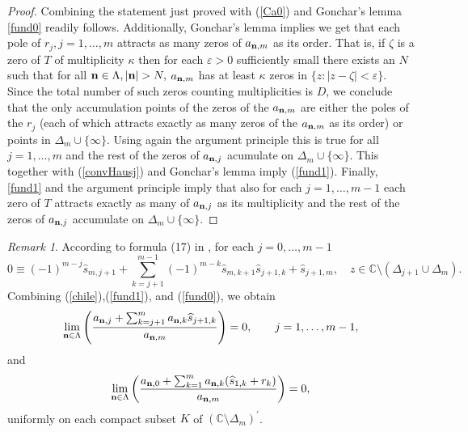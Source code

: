 \documentclass[10pt,a4paper]{article}
\theoremstyle{definition}
\theoremstyle{remark}
\newtheorem{remark}[theorem]{Remark}
\numberwithin{equation}{section}
\begin{document}
\begin{proof}
Combining the statement just proved with (\ref{Ca0}) and Gonchar's lemma \eqref{fund0} readily follows. Additionally, Gonchar's lemma implies  we get that each pole
of $r_j, j=1,\ldots,m$ attracts as many zeros of $a_{{\bf n},m}$ as its order. That is, if $\zeta$ is a zero of $T$ of multiplicity $\kappa$ then for each $\varepsilon >0$ sufficiently small there exists an $N$ such that for all ${\bf n} \in \Lambda, |{\bf n}| > N,$  $a_{{\bf n},m}$ has at least $\kappa$ zeros in $\{z:|z-\zeta| < \varepsilon\}$. Since the total number of such zeros counting multiplicities is $D$, we conclude that the only accumulation points of the zeros of the $a_{{\bf n},m}$ are either the poles of the $r_j$ (each of which attracts exactly as many zeros of the $a_{{\bf n},m}$ as its order) or points in $\Delta_m \cup \{\infty\}$. Using again the argument principle this is true for all $j=1,\ldots,m$ and the rest of the zeros of $a_{{\bf n},j}$ acumulate on $\Delta_m \cup \{\infty\}$. This together with  (\ref{convHausj}) and Gonchar's lemma imply  (\ref{fund1}). Finally,  \eqref{fund1} and the argument principle imply that also for each $j=1,\ldots,m-1$ each zero of $T$ attracts exactly as many of $a_{{\bf n},j}$ as its multiplicity and the rest of the zeros of $a_{{\bf n},j}$ accumulate on $\Delta_m \cup \{\infty\}$.
\end{proof}

\begin{remark}
According to formula (17) in \cite[Lemma 2.9]{FL4II}, for each $j=0,\ldots, m-1$
\begin{equation}\label{chile}
 0 \equiv (-1)^{m-j }\widehat{s}_{m,j+1}  + \sum_{k=j+1}^{m-1}(-1)^{m-k}   \widehat{s}_{m,k+1} \widehat{s}_{j+1,k} +
  \widehat{s}_{j+1, m}, \quad z \in \mathbb{C} \setminus (\Delta_{j+1} \cup \Delta_m).
\end{equation}
Combining (\ref{chile}),(\ref{fund1}), and (\ref{fund0}), we obtain
\begin{equation*}
  \lim_{{\bf n} \in \Lambda} \left( \frac{a_{{\bf n},j} + \sum_{k= j+1}^m a_{{\bf n},k} \widehat{s}_{j+1,k}}{a_{{\bf n},m}}\right) = 0, \qquad j=1,\ldots,m-1,
\end{equation*}
and
\begin{equation*}
  \lim_{{\bf n} \in \Lambda} \left( \frac{a_{{\bf n},0} + \sum_{k= 1}^m a_{{\bf n},k} (\widehat{s}_{1,k}+r_k)}{a_{{\bf n},m}} \right)= 0,
\end{equation*}
uniformly on each compact subset $K$ of $(\mathbb{C}\setminus \Delta_{m})^{\prime}$.
\end{remark}
\end{document}
